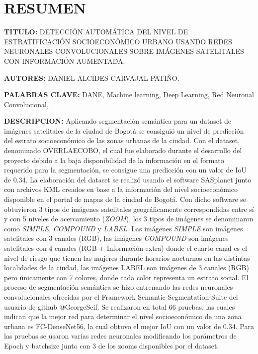     \newpage
	\tableofcontents
	\newpage \listoffigures
	\newpage \listoftables

	\setlength{\parskip}{\baselineskip} %


	\newpage\chapter*{RESUMEN}
    \textbf{TITULO:} DETECCIÓN AUTOMÁTICA DEL NIVEL DE ESTRATIFICACIÓN SOCIOECONÓMICO URBANO USANDO REDES NEURONALES CONVOLUCIONALES SOBRE IMÁGENES SATELITALES CON INFORMACIÓN AUMENTADA.
    
    \textbf{AUTORES:} DANIEL ALCIDES CARVAJAL PATIÑO.
    
    \textbf{PALABRAS CLAVE:} DANE, Machine learning, Deep Learning, Red Neuronal Convolucional, .	
    
    \textbf{DESCRIPCION:} Aplicando segmentación semántica para un dataset de imágenes satelitales de la ciudad de Bogotá se consiguió un nivel de predicción del estrato socioeconómico de las zonas urbanas de la ciudad. Con el dataset, denominado OVERLAECOBO, el cual fue elaborado durante el desarrollo del proyecto debido a la baja disponibilidad de la información en el formato requerido para la segmentación, se consigue una predicción con un valor de IoU de 0.34. La elaboración del dataset se realizó usando el software SASplanet junto con archivos KML creados en base a la información del nivel socioeconómico disponible en el portal de mapas de la ciudad de Bogotá. Con dicho software se obtuvieron 3 tipos de imágenes satelitales geográficamente correspondidas entre sí y con 5 niveles de acercamiento (\textit{ZOOM}), los 3 tipos de imágenes se denominaron como \textit{SIMPLE}, \textit{COMPOUND} y \textit{LABEL}. Las imágenes \textit{SIMPLE} son imágenes satelitales con 3 canales (RGB), las imágenes \textit{COMPOUND} son imágenes satelitales con 4 canales (RGB + Información extra) donde el cuarto canal es el nivel de riesgo que tienen las mujeres durante horarios nocturnos en las distintas localidades de la ciudad, las imágenes LABEL son imágenes de 3 canales (RGB) pero únicamente con 7 colores, donde cada color representa un estrato social. El proceso de segmentación semántica se hizo entrenando las redes neuronales convolucionales ofrecidas por el Framework Semantic-Segmentation-Suite del usuario de github @GeorgeSeif. Se realizaron en total 66 pruebas, las cuales indican que la mejor red para determinar el nivel socioeconómico de una zona urbana es FC-DenseNet56, la cual obtuvo el mejor IoU con un valor de 0.34. Para las pruebas se usaron varias redes neuronales modificando los parámetros de Epoch y batchsize junto con 3 de los zooms disponibles por el dataset. 
 
